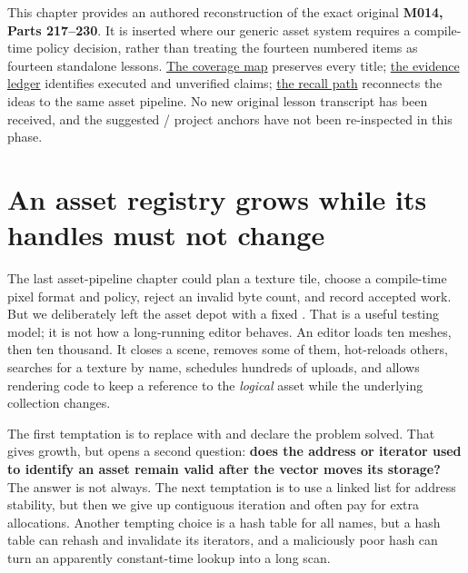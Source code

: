 This chapter provides an authored reconstruction of the exact original \textbf{M014, Parts 217--230}. It is inserted where our generic asset system requires a compile-time policy decision, rather than treating the fourteen numbered items as fourteen standalone lessons. \hyperref[appendix-fd090d982a15-m014-parts-217230-one-tile-planner-and-its-compile-time-policy-decisions]{The coverage map} preserves every title; \hyperref[appendix-a103e7846d21-phase-4-additive-reconstruction-m014-parts-217230]{the evidence ledger} identifies executed and unverified claims; \hyperref[appendix-960160274237-the-tile-planner-makes-a-choice-m014-reconstruction]{the recall path} reconnects the ideas to the same asset pipeline. No new original lesson transcript has been received, and the suggested  /  project anchors have not been re-inspected in this phase.

\section{An asset registry grows while its handles must not change}\label{05-engine-i-ch005-an-asset-registry-grows-while-its-handles-must-not-change}

\hypertarget{05-engine-i-ch005-an-asset-registry-grows-while-its-handles-must-not-change}{}

The last asset-pipeline chapter could plan a texture tile, choose a compile-time pixel format and policy, reject an invalid byte count, and record accepted work. But we deliberately left the asset depot with a fixed . That is a useful testing model; it is not how a long-running editor behaves. An editor loads ten meshes, then ten thousand. It closes a scene, removes some of them, hot-reloads others, searches for a texture by name, schedules hundreds of uploads, and allows rendering code to keep a reference to the \emph{logical} asset while the underlying collection changes.

The first temptation is to replace  with  and declare the problem solved. That gives growth, but opens a second question: \textbf{does the address or iterator used to identify an asset remain valid after the vector moves its storage?} The answer is not always. The next temptation is to use a linked list for address stability, but then we give up contiguous iteration and often pay for extra allocations. Another tempting choice is a hash table for all names, but a hash table can rehash and invalidate its iterators, and a maliciously poor hash can turn an apparently constant-time lookup into a long scan.

